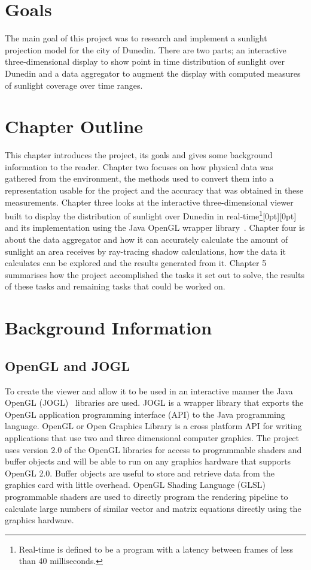 \documentclass[12pt]{report}
\newcommand{\note}[1]{\raisebox{0pt}[0pt][0pt]{\pdfcomment[open=true]{#1}}}
\newcommand{\notedme}[1]{\note{#1}}
\begin{document}
\section{Goals}
The main goal of this project was to research and implement a sunlight projection model for the city of Dunedin. There are two parts; an interactive three-dimensional display to show point in time distribution of sunlight over Dunedin and a data aggregator to augment the display with computed measures of sunlight coverage over time ranges.

\section{Chapter Outline}
This chapter introduces the project, its goals and gives some background information to the reader. Chapter two focuses on how physical data was gathered from the environment, the methods used to convert them into a representation usable for the project and the accuracy that was obtained in these measurements. Chapter three looks at the interactive three-dimensional viewer built to display the distribution of sunlight over Dunedin in real-time\footnote{Real-time is defined to be a program with a latency between frames of less than 40 milliseconds.}\notedme{Not clear _who_ definees it to be less than 40ms.} and its implementation using the Java OpenGL wrapper library~\cite{JOGL}. Chapter four is about the data aggregator and how it can accurately calculate the amount of sunlight an area receives by ray-tracing shadow calculations, how the data it calculates can be explored and the results generated from it. Chapter 5 summarises how the project accomplished the tasks it set out to solve, the results of these tasks and remaining tasks that could be worked on.

\section{Background Information}
\subsection{OpenGL and JOGL} 
To create the viewer and allow it to be used in an interactive manner the Java OpenGL (JOGL)~\cite{JOGL} libraries are used. JOGL is a wrapper library that exports the OpenGL application programming interface (API) to the Java programming language. OpenGL or Open Graphics Library is a cross platform API for writing applications that use two and three dimensional computer graphics. The project uses version 2.0 of the OpenGL libraries for access to programmable shaders and buffer objects and will be able to run on any graphics hardware that supports OpenGL 2.0. Buffer objects are useful to store and retrieve data from the graphics card with little overhead.
OpenGL Shading Language (GLSL) programmable shaders are used to directly program the rendering pipeline to calculate large numbers of similar vector and matrix equations directly using the graphics hardware.
\end{document}
